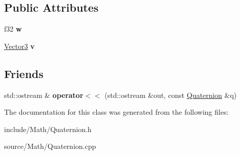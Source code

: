 \subsection*{Public Attributes}
\begin{DoxyCompactItemize}
\item 
f32 {\bfseries w}\hypertarget{classDE_1_1Quaternion_a95b5773a30c217a32176518000311287}{}\label{classDE_1_1Quaternion_a95b5773a30c217a32176518000311287}

\item 
\hyperlink{classDE_1_1Vector3}{Vector3} {\bfseries v}\hypertarget{classDE_1_1Quaternion_a23bc86f9e49c7df4bb98cf0bfd9762f7}{}\label{classDE_1_1Quaternion_a23bc86f9e49c7df4bb98cf0bfd9762f7}

\end{DoxyCompactItemize}
\subsection*{Friends}
\begin{DoxyCompactItemize}
\item 
std\+::ostream \& {\bfseries operator$<$$<$} (std\+::ostream \&out, const \hyperlink{classDE_1_1Quaternion}{Quaternion} \&q)\hypertarget{classDE_1_1Quaternion_a9d6837ef4f759aa5ecd417adcea2e908}{}\label{classDE_1_1Quaternion_a9d6837ef4f759aa5ecd417adcea2e908}

\end{DoxyCompactItemize}


The documentation for this class was generated from the following files\+:\begin{DoxyCompactItemize}
\item 
include/\+Math/Quaternion.\+h\item 
source/\+Math/Quaternion.\+cpp\end{DoxyCompactItemize}
